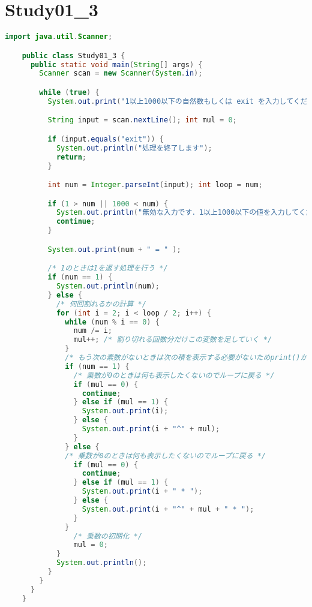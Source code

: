 \documentclass{jlreq}
\begin{document}
  \newpage
  \section*{Study01\_3}
  \begin{lstlisting}[caption=Study01\_3.javaのソースコード, label=code:in, language=java]
    import java.util.Scanner;

    public class Study01_3 {
      public static void main(String[] args) {
        Scanner scan = new Scanner(System.in);

        while (true) {
          System.out.print("1以上1000以下の自然数もしくは exit を入力してください: ");

          String input = scan.nextLine(); int mul = 0;

          if (input.equals("exit")) {
            System.out.println("処理を終了します");
            return;
          }

          int num = Integer.parseInt(input); int loop = num;

          if (1 > num || 1000 < num) {
            System.out.println("無効な入力です．1以上1000以下の値を入力してください");
            continue;
          }

          System.out.print(num + " = " );

          /* 1のときは1を返す処理を行う */
          if (num == 1) {
            System.out.println(num);
          } else {
            /* 何回割れるかの計算 */
            for (int i = 2; i < loop / 2; i++) {
              while (num % i == 0) {
                num /= i;
                mul++; /* 割り切れる回数分だけこの変数を足していく */
              }
              /* もう次の素数がないときは次の積を表示する必要がないためprint()から"*"を省く */
              if (num == 1) {
                /* 乗数が0のときは何も表示したくないのでループに戻る */
                if (mul == 0) {
                  continue;
                } else if (mul == 1) {
                  System.out.print(i);
                } else {
                  System.out.print(i + "^" + mul);
                }
              } else {
              /* 乗数が0のときは何も表示したくないのでループに戻る */
                if (mul == 0) {
                  continue;
                } else if (mul == 1) {
                  System.out.print(i + " * ");
                } else {
                  System.out.print(i + "^" + mul + " * ");
                }
              }
                /* 乗数の初期化 */
                mul = 0;
            }
            System.out.println();
          }
        }
      }
    }
  \end{lstlisting}
\end{document}
